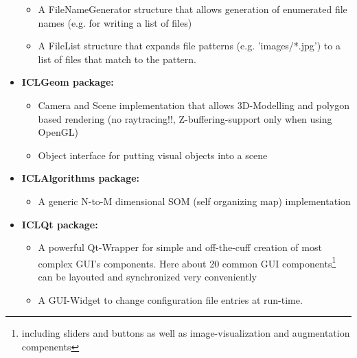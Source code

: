 \begin{itemize}
\begin{itemize}
        \item A FileNameGenerator structure that allows generation of enumerated file names (e.g. for writing a list of files)\\

        \item A FileList structure that expands file patterns (e.g. 'images/*.jpg') to a list of files that match to the pattern.\\
\end{itemize}


\item \textbf{ICLGeom package:} \\
\begin{itemize}
        \item Camera and Scene implementation that allows 3D-Modelling and polygon based rendering (no raytracing!!, Z-buffering-support only when using OpenGL) \\
              

        \item Object interface for putting visual objects into a scene
\end{itemize}

\item \textbf{ICLAlgorithms package:} \\
\begin{itemize}
        \item A generic N-to-M dimensional SOM (self organizing map) implementation\\
         
\end{itemize}

\item \textbf{ICLQt package:} \\
\begin{itemize}
        \item A powerful Qt-Wrapper for simple and off-the-cuff creation of most complex GUI's components. Here about 20 common GUI components\footnote{including sliders and buttons as well as image-visualization and augmentation compenents} can be layouted and synchronized very conveniently\\

        \item A GUI-Widget to change configuration file entries at run-time.\\
\end{itemize}


\end{itemize}

